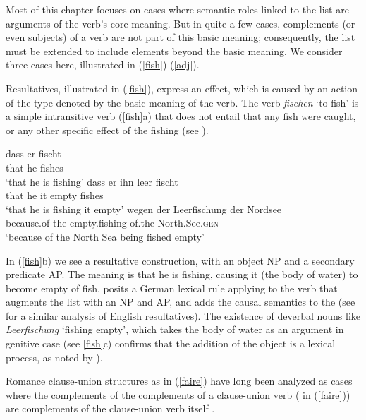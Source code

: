 \documentclass[output=paper
                ,modfonts
                ,nonflat
	        ,collection
	        ,collectionchapter
	        ,collectiontoclongg
 	        ,biblatex
                ,babelshorthands
                ,newtxmath
                ,draftmode
                ,colorlinks, citecolor=brown
]{./langsci/langscibook}
\begin{document}
Most of this chapter focuses on cases where semantic roles linked to the \argst list are arguments of the verb's core meaning. But in quite a few cases, complements (or even subjects) of a verb are not part of this basic meaning; consequently, the \argst list must be extended to include elements beyond the basic meaning. We consider three cases here, illustrated in (\ref{fish})-(\ref{adj}).  

Resultatives,  illustrated in (\ref{fish}), express an effect, which is caused by an action of the type denoted by the basic meaning of the verb. The verb \textit{fischen} `to fish' is a simple intransitive verb (\ref{fish}a) that does not entail that any fish were caught, or any other specific effect of the fishing (see \citealt{Mueller2002b,Wechsler2005result}).  

\begin{exe}
\ex\label{fish}
\begin{xlist}
\ex
\gll dass er  fischt\\
     that he  fishes\\
\glt `that he is fishing'
\ex 
\gll dass er ihn leer fischt\\
     that he it empty fishes\\
\glt `that he is fishing it empty'
\ex 
\gll wegen der Leerfischung der Nordsee \\
     because.of the empty.fishing of.the North.See.\textsc{gen} \\
\glt `because of the North Sea being fished empty'
\end{xlist}
\end{exe}

\noindent
 In (\ref{fish}b) we see a resultative construction, with an object NP and a secondary predicate AP.  The meaning is that he is fishing, causing it (the body of water) to become empty of fish.  \citet{Mueller2002b} posits a German lexical rule applying to the verb that augments the \argst list with an NP and AP, and adds the causal semantics to the \content (see \cite{Wechsler2005result} for a similar analysis of English resultatives).     The existence of deverbal nouns like \textit{Leerfischung} `fishing empty', which takes the body of water as an argument in genitive case (see \ref{fish}c) confirms that the addition of the object is a lexical process, as noted by \citealt{Mueller2002b}).  

Romance clause-union structures as in (\ref{faire}) have long been analyzed as cases where the complements of the complements of a clause-union verb ( in (\ref{faire})) are complements of the clause-union verb itself \citep{Aissen1979}.
\end{document}
